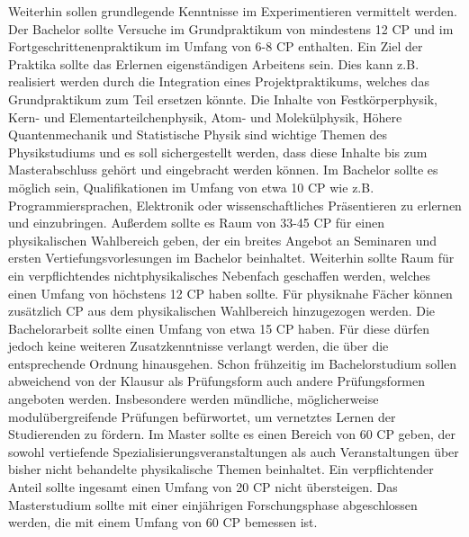         Weiterhin sollen grundlegende Kenntnisse im Experimentieren vermittelt werden. Der Bachelor sollte Versuche im Grundpraktikum von mindestens 12 CP und im Fortgeschrittenenpraktikum im Umfang von 6-8 CP enthalten. Ein Ziel der Praktika sollte das Erlernen eigenständigen Arbeitens sein. Dies kann z.B. realisiert werden durch die Integration eines Projektpraktikums, welches das Grundpraktikum zum Teil ersetzen könnte.
        Die Inhalte von Festkörperphysik, Kern- und Elementarteilchenphysik, Atom- und Molekülphysik, Höhere Quantenmechanik und Statistische Physik sind wichtige Themen des Physikstudiums und es soll sichergestellt werden, dass diese Inhalte bis zum Masterabschluss gehört und eingebracht werden können.
        Im Bachelor sollte es möglich sein, Qualifikationen im Umfang von etwa 10 CP wie z.B. Programmiersprachen, Elektronik oder wissenschaftliches Präsentieren zu erlernen und einzubringen. Außerdem sollte es Raum von 33-45 CP für einen physikalischen Wahlbereich geben, der ein breites Angebot an Seminaren und ersten Vertiefungsvorlesungen im Bachelor beinhaltet.
        Weiterhin sollte Raum für ein verpflichtendes nichtphysikalisches Nebenfach geschaffen werden, welches einen Umfang von höchstens 12 CP haben sollte. Für physiknahe Fächer können zusätzlich CP aus dem physikalischen Wahlbereich hinzugezogen werden.
        Die Bachelorarbeit sollte einen Umfang von etwa 15 CP haben. Für diese dürfen jedoch keine weiteren Zusatzkenntnisse verlangt werden, die über die entsprechende Ordnung hinausgehen.
        Schon frühzeitig im Bachelorstudium sollen abweichend von der Klausur als Prüfungsform auch andere Prüfungsformen angeboten werden. Insbesondere werden mündliche, möglicherweise modulübergreifende Prüfungen befürwortet, um vernetztes Lernen der Studierenden zu fördern.
        Im Master sollte es einen Bereich von 60 CP geben, der sowohl vertiefende Spezialisierungsveranstaltungen als auch Veranstaltungen über bisher nicht behandelte physikalische Themen beinhaltet. Ein verpflichtender Anteil sollte ingesamt einen Umfang von 20 CP nicht übersteigen.
        Das Masterstudium sollte mit einer einjährigen Forschungsphase abgeschlossen werden, die mit einem Umfang von 60 CP bemessen ist.
